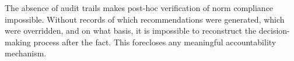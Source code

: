 The absence of audit trails makes post-hoc verification of norm compliance impossible. Without records of which recommendations were generated, which were overridden, and on what basis, it is impossible to reconstruct the decision-making process after the fact. This forecloses any meaningful accountability mechanism.
